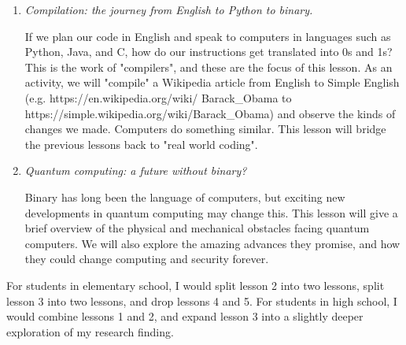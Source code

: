 \begin{enumerate}
  \item \emph{Compilation: the journey from English to Python to binary.}

  If we plan our code in English and speak to computers in languages such as Python, Java, and C, how do our instructions get translated into 0s and 1s?
  This is the work of "compilers", and these are the focus of this lesson.
  As an activity, we will "compile" a Wikipedia article from English to Simple English (e.g. https://en.wikipedia.org/wiki/ Barack\_Obama to https://simple.wikipedia.org/wiki/Barack\_Obama) and observe the kinds of changes we made.
  Computers do something similar.
  This lesson will bridge the previous lessons back to "real world coding".

  \item \emph{Quantum computing: a future without binary?}

  Binary has long been the language of computers, but exciting new developments in quantum computing may change this.
  This lesson will give a brief overview of the physical and mechanical obstacles facing quantum computers.
  We will also explore the amazing advances they promise, and how they could change computing and security forever.

\end{enumerate}

For students in elementary school, I would split lesson 2 into two lessons, split lesson 3 into two lessons, and drop lessons 4 and 5.
For students in high school, I would combine lessons 1 and 2, and expand lesson 3 into a slightly deeper exploration of my research finding.